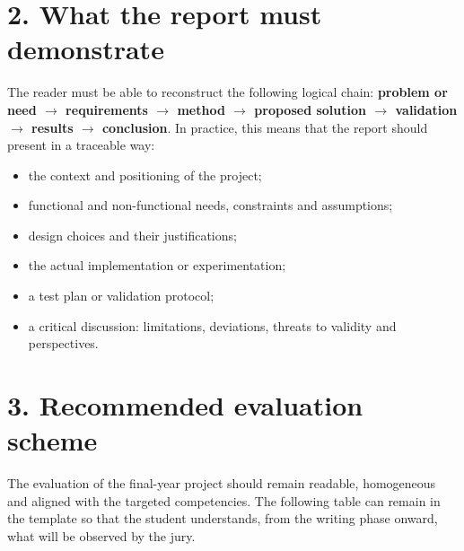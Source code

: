 
\section*{2. What the report must demonstrate}

The reader must be able to reconstruct the following logical chain: \textbf{problem or need $\rightarrow$ requirements $\rightarrow$ method $\rightarrow$ proposed solution $\rightarrow$ validation $\rightarrow$ results $\rightarrow$ conclusion}. In practice, this means that the report should present in a traceable way:

\begin{itemize}[leftmargin=1.2cm]
\item the context and positioning of the project;
\item functional and non-functional needs, constraints and assumptions;
\item design choices and their justifications;
\item the actual implementation or experimentation;
\item a test plan or validation protocol;
\item a critical discussion: limitations, deviations, threats to validity and perspectives.
\end{itemize}


\section*{3. Recommended evaluation scheme}

The evaluation of the final-year project should remain readable, homogeneous and aligned with the targeted competencies. The following table can remain in the template so that the student understands, from the writing phase onward, what will be observed by the jury.

